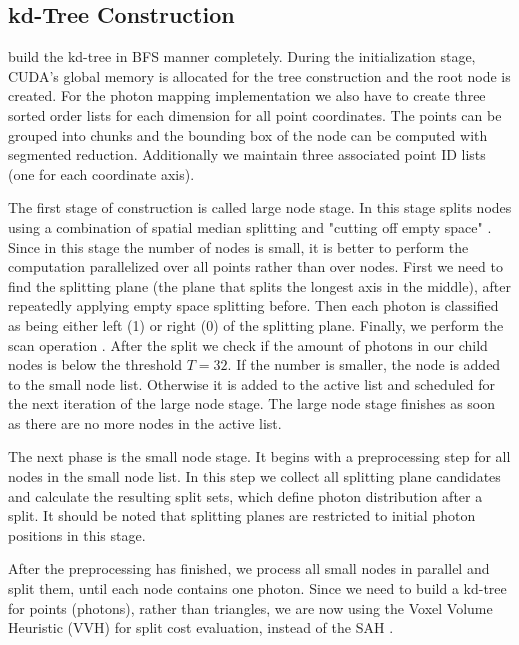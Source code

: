 \subsection{kd-Tree Construction}
\label{subsec:kdtree_construction}

\citeauthor{Zhou2008} build the kd-tree in BFS manner completely. 
During the initialization stage, CUDA's global memory is allocated for the tree construction and the root node is created. For the photon mapping implementation we also have to create three sorted order lists for each dimension for all point coordinates. The points can be grouped into chunks and the bounding box of the node can be computed with segmented reduction.
Additionally we maintain three associated point ID lists (one for each coordinate axis).

The first stage of construction is called large node stage. In this stage splits nodes using a combination of spatial median splitting and "cutting off empty space" \cite{Havran2000:PhD}. Since in this stage the number of nodes is small, it is better to perform the computation parallelized over all points rather than over nodes. First we need to find the splitting plane (the plane that splits the longest axis in the middle), after repeatedly applying empty space splitting before. Then each photon is classified as being either left (1) or right (0) of the splitting plane. Finally, we perform the scan operation \cite{Mark2007}. After the split we check if the amount of photons in our child nodes is below the threshold \(T = 32\). If the number is smaller, the node is added to the small node list. Otherwise it is added to the active list and scheduled for the next iteration of the large node stage. The large node stage finishes as soon as there are no more nodes in the active list.

The next phase is the small node stage. It begins with a preprocessing step for all nodes in the small node list. In this step we collect all splitting plane candidates and calculate the resulting split sets, which define photon distribution after a split. It should be noted that splitting planes are restricted to initial photon positions in this stage.

After the preprocessing has finished, we process all small nodes in parallel and split them, until each node contains one photon. Since we need to build a kd-tree for points (photons), rather than triangles, we are now using the Voxel Volume Heuristic (VVH) \cite{wald:04:VVH} for split cost evaluation, instead of the SAH \cite{Havran2000:PhD}.

